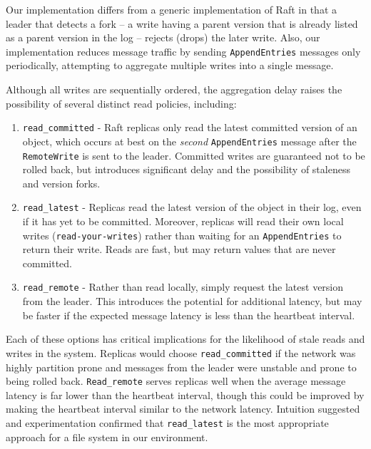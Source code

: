 \documentclass[10pt,conference,letterpaper]{IEEEtran}
\newcommand{\todo}[1]{{\textcolor{red}{#1}}}
\newcommand{\pjk}[1]{[\todo{PJK: #1}]}
\begin{document}
Our implementation differs from a generic implementation of Raft in that
a leader that detects a
fork -- a write having a parent version that is already listed as a parent version in the
log -- rejects (drops) the later write.
Also, our implementation reduces message traffic by sending \texttt{AppendEntries}
messages only periodically, attempting to aggregate multiple writes into a single
message.



Although all writes are sequentially ordered, the aggregation delay raises the possibility
of several distinct read policies, including:
\begin{enumerate}
    \item \texttt{read\_committed} - Raft replicas only read the latest committed version
of an object, which occurs at best on the \emph{second} \texttt{AppendEntries} message
after the \texttt{RemoteWrite} is sent to the leader. Committed writes are guaranteed not
to be rolled back, but introduces significant delay and the possibility of staleness and
version forks.
    \item \texttt{read\_latest} - Replicas read the latest version of the object
in their log, even if it has yet to be committed.
Moreover, replicas will read their own local writes (\texttt{read-your-writes}) rather than waiting for an
\texttt{AppendEntries} to return their write. Reads are fast, but may return values that
are never committed.
    \item \texttt{read\_remote} - Rather than read locally, simply request the latest
version from the leader.
This introduces the potential for additional latency, but may be faster if the expected
message latency is less than the heartbeat interval.
\end{enumerate}

Each of these options has critical implications for the likelihood of stale reads and
writes in the system.
Replicas would choose \texttt{read\_committed} if the network was highly partition prone and
messages from the leader were unstable and prone to being rolled back.
\texttt{Read\_remote} serves replicas well when the average message latency is far lower than the
heartbeat interval, though this could be improved by making the heartbeat interval similar
to the network latency.
Intuition suggested and experimentation confirmed that \texttt{read\_latest}
is the most appropriate approach for a file
system in our environment.
\end{document}
